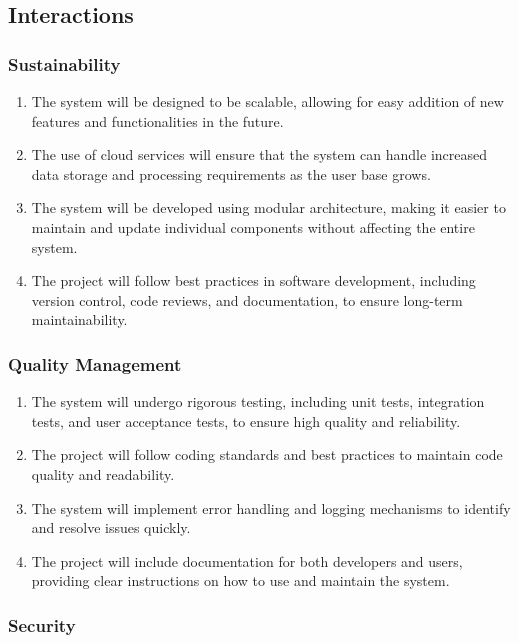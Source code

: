 \documentclass[openany]{report}
\begin{document}
\subsection{Interactions}
\subsubsection{Sustainability}
\begin{enumerate}
    \item The system will be designed to be scalable, allowing for easy addition of new features and functionalities in the future.
    \item The use of cloud services will ensure that the system can handle increased data storage and processing requirements as the user base grows.
    \item The system will be developed using modular architecture, making it easier to maintain and update individual components without affecting the entire system.
    \item The project will follow best practices in software development, including version control, code reviews, and documentation, to ensure long-term maintainability.
\end{enumerate}
\subsubsection{Quality Management}
\begin{enumerate}
    \item The system will undergo rigorous testing, including unit tests, integration tests, and user acceptance tests, to ensure high quality and reliability.
    \item The project will follow coding standards and best practices to maintain code quality and readability.
    \item The system will implement error handling and logging mechanisms to identify and resolve issues quickly.
    \item The project will include documentation for both developers and users, providing clear instructions on how to use and maintain the system.
\end{enumerate}
\subsubsection{Security}
\end{document}
